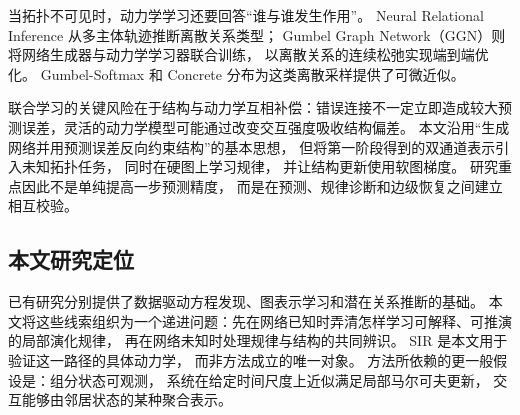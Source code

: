 当拓扑不可见时，动力学学习还要回答“谁与谁发生作用”。
Neural Relational Inference 从多主体轨迹推断离散关系类型\cite{kipf2018nri}；
Gumbel Graph Network（GGN）则将网络生成器与动力学学习器联合训练，
以离散关系的连续松弛实现端到端优化\cite{zhang2019ggn}。
Gumbel-Softmax 和 Concrete 分布为这类离散采样提供了可微近似\cite{jang2017,maddison2017}。

联合学习的关键风险在于结构与动力学互相补偿：错误连接不一定立即造成较大预测误差，灵活的动力学模型可能通过改变交互强度吸收结构偏差。
本文沿用“生成网络并用预测误差反向约束结构”的基本思想，
但将第一阶段得到的双通道表示引入未知拓扑任务，
同时在硬图上学习规律，
并让结构更新使用软图梯度。
研究重点因此不是单纯提高一步预测精度，
而是在预测、规律诊断和边级恢复之间建立相互校验。

\subsection{本文研究定位}

已有研究分别提供了数据驱动方程发现、图表示学习和潜在关系推断的基础。
本文将这些线索组织为一个递进问题：先在网络已知时弄清怎样学习可解释、可推演的局部演化规律，
再在网络未知时处理规律与结构的共同辨识。
SIR 是本文用于验证这一路径的具体动力学，
而非方法成立的唯一对象。
方法所依赖的更一般假设是：组分状态可观测，
系统在给定时间尺度上近似满足局部马尔可夫更新，
交互能够由邻居状态的某种聚合表示。
